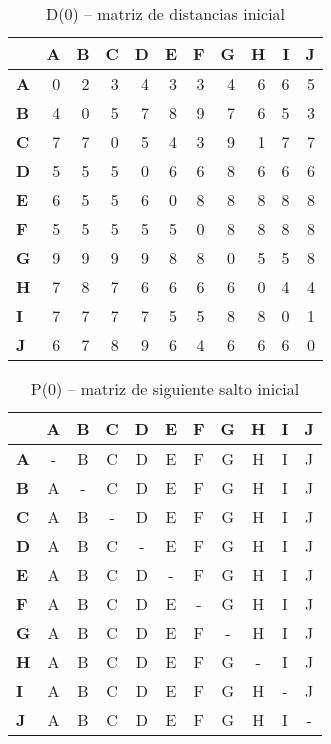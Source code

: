 \documentclass{article}
\begin{document}
\begin{table}[H]\centering
\caption{D(0) -- matriz de distancias inicial}
\begin{tabular}{l r r r r r r r r r r}
\toprule
 & \textbf{A} & \textbf{B} & \textbf{C} & \textbf{D} & \textbf{E} & \textbf{F} & \textbf{G} & \textbf{H} & \textbf{I} & \textbf{J}\\\midrule
\textbf{A} & 0 & 2 & 3 & 4 & 3 & 3 & 4 & 6 & 6 & 5 \\
\textbf{B} & 4 & 0 & 5 & 7 & 8 & 9 & 7 & 6 & 5 & 3 \\
\textbf{C} & 7 & 7 & 0 & 5 & 4 & 3 & 9 & 1 & 7 & 7 \\
\textbf{D} & 5 & 5 & 5 & 0 & 6 & 6 & 8 & 6 & 6 & 6 \\
\textbf{E} & 6 & 5 & 5 & 6 & 0 & 8 & 8 & 8 & 8 & 8 \\
\textbf{F} & 5 & 5 & 5 & 5 & 5 & 0 & 8 & 8 & 8 & 8 \\
\textbf{G} & 9 & 9 & 9 & 9 & 8 & 8 & 0 & 5 & 5 & 8 \\
\textbf{H} & 7 & 8 & 7 & 6 & 6 & 6 & 6 & 0 & 4 & 4 \\
\textbf{I} & 7 & 7 & 7 & 7 & 5 & 5 & 8 & 8 & 0 & 1 \\
\textbf{J} & 6 & 7 & 8 & 9 & 6 & 4 & 6 & 6 & 6 & 0 \\
\bottomrule
\end{tabular}
\end{table}

\begin{table}[H]\centering
\caption{P(0) -- matriz de siguiente salto inicial}
\begin{tabular}{l c c c c c c c c c c}
\toprule
 & \textbf{A} & \textbf{B} & \textbf{C} & \textbf{D} & \textbf{E} & \textbf{F} & \textbf{G} & \textbf{H} & \textbf{I} & \textbf{J}\\\midrule
\textbf{A} & - & B & C & D & E & F & G & H & I & J \\
\textbf{B} & A & - & C & D & E & F & G & H & I & J \\
\textbf{C} & A & B & - & D & E & F & G & H & I & J \\
\textbf{D} & A & B & C & - & E & F & G & H & I & J \\
\textbf{E} & A & B & C & D & - & F & G & H & I & J \\
\textbf{F} & A & B & C & D & E & - & G & H & I & J \\
\textbf{G} & A & B & C & D & E & F & - & H & I & J \\
\textbf{H} & A & B & C & D & E & F & G & - & I & J \\
\textbf{I} & A & B & C & D & E & F & G & H & - & J \\
\textbf{J} & A & B & C & D & E & F & G & H & I & - \\
\bottomrule
\end{tabular}
\end{table}
\end{document}

